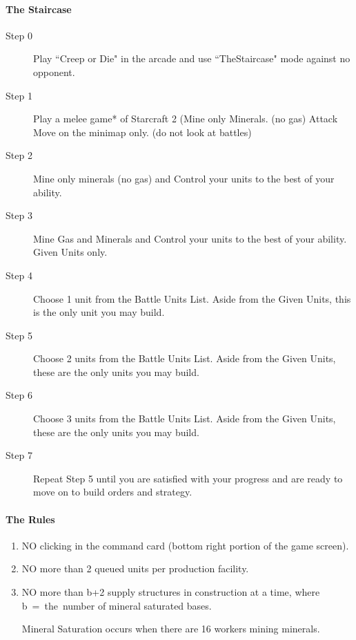 \documentclass{article}
\begin{document}
\paragraph{The Staircase}
\begin{description}
    \item[Step 0] Play ``Creep or Die" in the arcade and use ``TheStaircase"
        mode against no opponent. 
    \item[Step 1] Play a melee game* of Starcraft 2 (Mine only Minerals. (no
        gas) Attack Move on the minimap only. (do not look at battles)
    \item[Step 2] Mine only minerals (no gas) and Control your units to the best
        of your ability.
    \item[Step 3] Mine Gas and Minerals and Control your units to the best of
        your ability. Given Units only.
    \item[Step 4] Choose 1 unit from the Battle Units List. Aside from the Given
        Units, this is the only unit you may build.
    \item[Step 5] Choose 2 units from the Battle Units List. Aside from the
        Given Units, these are the only units you may build.
    \item[Step 6] Choose 3 units from the Battle Units List. Aside from the
        Given Units, these are the only units you may build.
    \item[Step 7] Repeat Step 5 until you are satisfied with your progress and
        are ready to move on to build orders and strategy.
\end{description}

\paragraph{The Rules}
\begin{enumerate}
    \item NO clicking in the command card  (bottom right portion of the game
        screen).
    \item NO more than 2 queued units per production facility.
    \item NO more than b+2 supply structures in construction at a time, where 
        b~=~the~number of mineral saturated bases.
        
        Mineral Saturation occurs when there are 16 workers mining minerals.
\end{enumerate}
\end{document}
